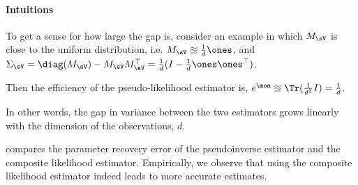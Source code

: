 \paragraph{Intuitions}
To get a sense for how large the gap is, consider an example in which
$M_\sV$ is close to the uniform distribution, i.e. $M_\sV
\approxeq \frac{1}{d} \ones$, and $\Sigma_\sV = \diag(M_\sV) - M_\sV
M_\sV^\top = \frac{1}{d}(I - \frac{1}{d} \ones \ones^\top)$.

Then the efficiency of the pseudo-likelihood estimator is,
$e^\mom \approxeq \Tr(\frac{1}{d^2} I) = \frac{1}{d}$.

In other words, the gap in variance between the two estimators
grows linearly with the dimension of the observations, $d$.

 compares the parameter recovery error of the
  pseudoinverse estimator and the composite likelihood estimator.
Empirically, we observe that using the composite likelihood estimator
indeed leads to more accurate estimates.


